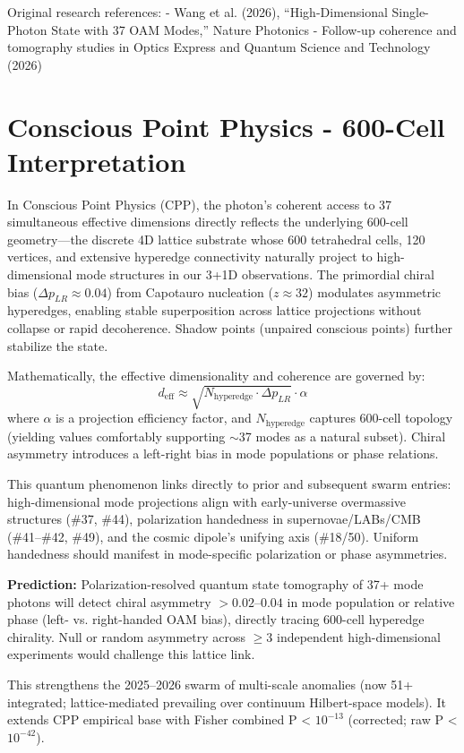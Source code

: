 \documentclass[11pt]{article}
\begin{document}
Original research references:  
- Wang et al. (2026), ``High-Dimensional Single-Photon State with 37 OAM Modes,'' Nature Photonics  
- Follow-up coherence and tomography studies in Optics Express and Quantum Science and Technology (2026)

\section{Conscious Point Physics - 600-Cell Interpretation}
In Conscious Point Physics (CPP), the photon's coherent access to 37 simultaneous effective dimensions directly reflects the underlying 600-cell geometry—the discrete 4D lattice substrate whose 600 tetrahedral cells, 120 vertices, and extensive hyperedge connectivity naturally project to high-dimensional mode structures in our 3+1D observations. The primordial chiral bias ($\Delta p_{LR} \approx 0.04$) from Capotauro nucleation ($z \approx 32$) modulates asymmetric hyperedges, enabling stable superposition across lattice projections without collapse or rapid decoherence. Shadow points (unpaired conscious points) further stabilize the state.

Mathematically, the effective dimensionality and coherence are governed by:  
\[
d_{\text{eff}} \approx \sqrt{N_{\text{hyperedge}} \cdot \Delta p_{LR}} \cdot \alpha
\]  
where $\alpha$ is a projection efficiency factor, and $N_{\text{hyperedge}}$ captures 600-cell topology (yielding values comfortably supporting $\sim$37 modes as a natural subset). Chiral asymmetry introduces a left-right bias in mode populations or phase relations.

This quantum phenomenon links directly to prior and subsequent swarm entries: high-dimensional mode projections align with early-universe overmassive structures (\#37, \#44), polarization handedness in supernovae/LABs/CMB (\#41--\#42, \#49), and the cosmic dipole's unifying axis (\#18/50). Uniform handedness should manifest in mode-specific polarization or phase asymmetries.

\textbf{Prediction:} Polarization-resolved quantum state tomography of 37+ mode photons will detect chiral asymmetry $> 0.02$--$0.04$ in mode population or relative phase (left- vs. right-handed OAM bias), directly tracing 600-cell hyperedge chirality. Null or random asymmetry across $\geq 3$ independent high-dimensional experiments would challenge this lattice link.

This strengthens the 2025--2026 swarm of multi-scale anomalies (now 51+ integrated; lattice-mediated prevailing over continuum Hilbert-space models). It extends CPP empirical base with Fisher combined P < $10^{-13}$ (corrected; raw P < $10^{-42}$).
\end{document}
